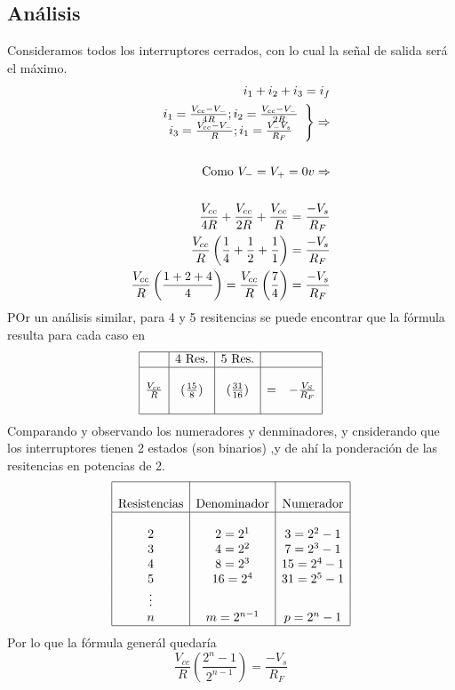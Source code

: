 \documentclass[12pt,spanish,lettersize,twocolumn]{article}
\begin{document}
\subsection{An\'alisis}
Consideramos todos los interruptores cerrados, con lo cual la se\~nal de salida ser\'a el m\'aximo.
\begin{eqnarray}
i_1+i_2+i_3=i_f\\
\left.
\begin{array}{c}
i_1=\frac{V_{cc}-V_{-}}{4R}; i_2=\frac{V_{cc}-V_-}{2R}\\
i_3=\frac{V_{cc}-V_-}{R}; i_1=\frac{V_-V_s}{R_F}\end{array}\right\}\Rightarrow\\
\nonumber\\
\nonumber\textnormal{Como $V_-=V_+=0v$}\Rightarrow\\
\nonumber\\
\frac{V_{cc}}{4R}+\frac{V_{cc}}{2R}+\frac{V_{cc}}{R}=\frac{-V_s}{R_F}\\
\nonumber\frac{V_{cc}}{R}\left(\frac{1}{4}+\frac{1}{2}+\frac{1}{1}\right)=\frac{-V_s}{R_F}\\
\frac{V_{cc}}{R}\left(\frac{1+2+4}{4}\right)=\frac{V_{cc}}{R}\left(\frac{7}{4}\right)=\frac{-V_s}{R_F}
\end{eqnarray}
POr un an\'alisis similar, para 4 y 5 resitencias se puede encontrar que la f\'ormula resulta para cada caso en\\
\begin{equation}
\begin{array}{|c|c|c|cr|}
\hline
 & \textnormal{4 Res.}& \textnormal{5 Res.} & & \\
\hline
 & & & & \\
\frac{V_{cc}}{R} & (\frac{15}{8}) & (\frac{31}{16}) & = & -\frac{V_S}{R_F}\\
 & & & & \\
\hline
\end{array}
\end{equation}
Comparando y observando los numeradores y denminadores, y cnsiderando que los interruptores tienen 2 estados (son binarios) ,y de ah\'i la ponderaci\'on de las resitencias en potencias de 2.
\begin{equation*}
\begin{array}{|c|c|c|}
\hline &       & \\
\textnormal{Resistencias} & \textnormal{Denominador} & \textnormal{Numerador}\\
\hline & &\\
2 &  2=2^1     &  3=2^2-1\\
3 &  4=2^2     &  7=2^3-1\\
4 &  8=2^3     & 15=2^4-1\\
5 & 16=2^4     & 31=2^5-1\\
\vdots &       & \\
n &  m=2^{n-1} &  p=2^n-1\\
\hline
\end{array}
\end{equation*}
Por lo que la f\'ormula gener\'al quedar\'ia
\begin{equation}
\frac{V_{cc}}{R}\left(\frac{2^n-1}{2^{n-1}}\right)=\frac{-V_s}{R_F}
\end{equation}
\end{document}
